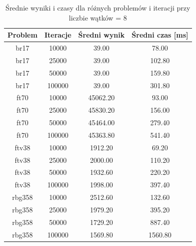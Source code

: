 \begin{table}[h]
\centering
\begin{tabular}{|c|c|c|c|}
\hline
\textbf{Problem} & \textbf{Iteracje} & \textbf{Średni wynik} & \textbf{Średni czas [ms]} \\
\hline
br17 & 10000 & 39.00 & 78.00 \\
br17 & 25000 & 39.00 & 102.80 \\
br17 & 50000 & 39.00 & 159.80 \\
br17 & 100000 & 39.00 & 301.80 \\
\hline
ft70 & 10000 & 45062.20 & 93.00 \\
ft70 & 25000 & 45830.20 & 156.00 \\
ft70 & 50000 & 45464.00 & 279.40 \\
ft70 & 100000 & 45363.80 & 541.40 \\
\hline
ftv38 & 10000 & 1912.20 & 69.20 \\
ftv38 & 25000 & 2000.00 & 110.20 \\
ftv38 & 50000 & 1932.60 & 220.20 \\
ftv38 & 100000 & 1998.00 & 397.40 \\
\hline
rbg358 & 10000 & 2512.60 & 132.60 \\
rbg358 & 25000 & 1979.20 & 395.20 \\
rbg358 & 50000 & 1729.20 & 887.40 \\
rbg358 & 100000 & 1569.80 & 1560.80 \\
\hline
\end{tabular}
\caption{Średnie wyniki i czasy dla różnych problemów i iteracji przy liczbie wątków = 8}
\label{tab:srednie_wyniki_{threads}}
\end{table}
